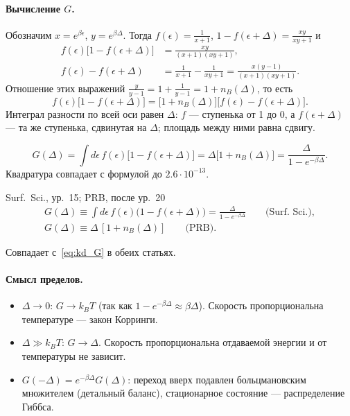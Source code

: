 \paragraph{Вычисление $G$.} Обозначим $x=e^{\beta\epsilon}$, $y=e^{\beta\Delta}$. Тогда
$f(\epsilon)=\frac{1}{x+1}$, $1-f(\epsilon+\Delta)=\frac{xy}{xy+1}$ и
\[
\begin{aligned}
f(\epsilon)\big[1-f(\epsilon+\Delta)\big]&=\frac{xy}{(x+1)(xy+1)},\\
f(\epsilon)-f(\epsilon+\Delta)&=\frac{1}{x+1}-\frac{1}{xy+1}=\frac{x(y-1)}{(x+1)(xy+1)} .
\end{aligned}
\]
Отношение этих выражений $\frac{y}{y-1}=1+\frac{1}{y-1}=1+n_B(\Delta)$, то есть
\[
f(\epsilon)\big[1-f(\epsilon+\Delta)\big]=\big[1+n_B(\Delta)\big]\big[f(\epsilon)-f(\epsilon+\Delta)\big].
\]
Интеграл разности по всей оси равен $\Delta$: $f$ --- ступенька от 1 до 0, а
$f(\epsilon+\Delta)$ --- та же ступенька, сдвинутая на $\Delta$; площадь между ними
равна сдвигу.
\begin{resbox}
\begin{equation}
G(\Delta)=\int d\epsilon\,f(\epsilon)\big[1-f(\epsilon+\Delta)\big]
=\Delta\big[1+n_B(\Delta)\big]=\frac{\Delta}{1-e^{-\beta\Delta}} .
\label{eq:kd_G}
\end{equation}
Квадратура совпадает с формулой до $2.6\cdot10^{-13}$.
\end{resbox}
\begin{paperbox}{Surf.\ Sci., ур.~15; PRB, после ур.~20}
\begin{gather*}
G(\Delta)\equiv\int d\epsilon\,f(\epsilon)\big(1-f(\epsilon+\Delta)\big)=\frac{\Delta}{1-e^{-\beta\Delta}}
\qquad\text{(Surf.\ Sci.)},\\
G(\Delta)\equiv\Delta\,[1+n_B(\Delta)]\qquad\text{(PRB)}.
\end{gather*}
\end{paperbox}
\begin{cmpbox}
Совпадает с~\eqref{eq:kd_G} в обеих статьях.
\end{cmpbox}

\paragraph{Смысл пределов.}
\begin{itemize}
\item $\Delta\to0$: $G\to k_BT$ (так как $1-e^{-\beta\Delta}\approx\beta\Delta$). Скорость
  пропорциональна температуре --- закон Корринги.
\item $\Delta\gg k_BT$: $G\to\Delta$. Скорость пропорциональна отдаваемой энергии и
  от температуры не зависит.
\item $G(-\Delta)=e^{-\beta\Delta}G(\Delta)$: переход вверх подавлен больцмановским
  множителем (детальный баланс), стационарное состояние --- распределение
  Гиббса.
\end{itemize}

